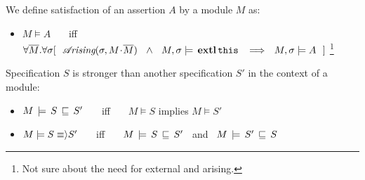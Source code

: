 {{\begin{definition} 
\label{def:assertion-inference-semantics}
We define satisfaction of an assertion $A$ by a  module $M$ as:
\begin{itemize}
\item
{
$M \models A$   \ \ \ iff \ \ \  $\forall \overline{M}. \forall \sigma
[\ \    \arising{\sigma}{M\madd\overline{M}}\   \  \wedge\ \  \satisfiesA {M}   {\sigma} {\external{\prg{this}}} 
\   \ \Longrightarrow \ \ \satisfiesA{M}{\sigma}{A}\ \ ]$
}\footnote{Not sure about the need for external and arising.}
\end{itemize}
\end{definition}


\begin{definition} 
\label{def:specification-implication-semantics}
Specification $S$ is stronger than another specification $S'$  in the context of a  module: 
 \begin{itemize}[itemsep=5pt]
\item 
$M\, \models\, S\, \sqsubseteq\, S'$   \ \ \ iff \ \ \  $M\models S$ implies $M \models S'$
\item
$M \models S  \equiv \rangle S'$   \ \ \ iff \ \ \ $M\, \models\, S\, \sqsubseteq\, S'$  \ and \  $M\, \models\, S'\, \sqsubseteq\, S$    
\end{itemize}
\end{definition}

\noindent
{}

 
}}
